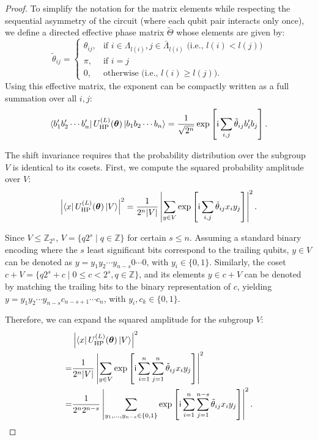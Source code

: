 \begin{proof}
    To simplify the notation for the matrix elements while respecting the sequential asymmetry of the circuit (where each qubit pair interacts only once), we define a directed effective phase matrix $\tilde{\Theta}$ whose elements are given by:
    \begin{equation}
        \tilde{\theta}_{ij} = \begin{cases}
            \theta_{ij}, & \text{if } i \in \Lambda_{l(i)}, j \in \bar{\Lambda}_{l(i)} \text{ (i.e., } l(i) < l(j)) \\
            \pi, & \text{if } i = j \\
            0, & \text{otherwise (i.e., } l(i) \ge l(j)).
        \end{cases}
    \end{equation}
    Using this effective matrix, the exponent can be compactly written as a full summation over all $i, j$:
    \begin{equation}
        \bra{b'_1 b'_2 \cdots b'_n} U_{\mathrm{HP}}^{(L)}(\bm \theta) \ket{b_1 b_2\cdots b_n} = \frac{1}{\sqrt{2^n}}\exp\left[ \mathsf{i} \sum_{i, j} \tilde{\theta}_{ij} b'_i b_j \right].
    \end{equation}
    
    The shift invariance requires that the probability distribution over the subgroup $V$ is identical to its cosets. First, we compute the squared probability amplitude over $V$:
    \begin{equation}
        \left|\bra{x}U_{\mathrm{HP}}^{(L)}(\bm \theta)\ket{V}\right|^2
        = \frac{1}{2^n |V|}\left|\sum_{y\in V}  \exp\left[ \mathsf{i} \sum_{i, j} \tilde{\theta}_{ij} x_i y_j \right] \right|^2.
    \end{equation}
    
    Since $V \leq \mathbb{Z}_{2^n}$, $V = \{q 2^s \mid q \in \mathbb{Z} \}$ for certain $s \leq n$. Assuming a standard binary encoding where the $s$ least significant bits correspond to the trailing qubits, $y\in V$ can be denoted as $y = y_1y_2\cdots y_{n-s} 0 \cdots 0$, with $y_i \in \{0,1\}$. Similarly, the coset $c + V = \{q 2^s  + c\mid 0 \le c < 2^s, q \in \mathbb{Z} \}$, and its elements $y\in c+V$ can be denoted by matching the trailing bits to the binary representation of $c$, yielding $y = y_1y_2\cdots y_{n-s} c_{n-s+1} \cdots c_n$, with $y_i, c_k \in \{0,1\}$.
    
    Therefore, we can expand the squared amplitude for the subgroup $V$:
    \begin{align}
        &\left|\bra{x}U_{\mathrm{HP}}^{(L)}(\bm \theta)\ket{V}\right|^2 \notag \\
        =& \frac{1}{2^n |V|}\left|\sum_{y\in V}  \exp\left[ \mathsf{i} \sum_{i=1}^n \sum_{j=1}^n \tilde{\theta}_{ij} x_i y_j \right] \right|^2 \\
        =& \frac{1}{2^n 2^{n-s}}\left| \sum_{y_1, \dots, y_{n-s} \in \{0,1\}} \exp\left[ \mathsf{i} \sum_{i=1}^n \sum_{j=1}^{n-s} \tilde{\theta}_{ij} x_i y_j \right] \right|^2.
    \end{align}
    

\end{proof}

